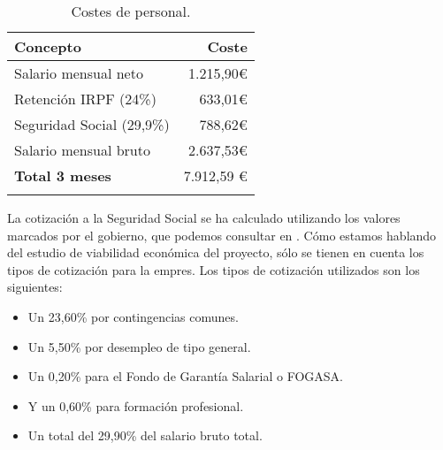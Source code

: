 \begin{longtable}[]{@{}lr@{}}
\toprule
\begin{minipage}[b]{0.38\columnwidth}\raggedright\strut
\textbf{Concepto}\strut
\end{minipage} & \begin{minipage}[b]{0.20\columnwidth}\raggedright\strut
\textbf{Coste}\strut
\end{minipage}\tabularnewline
\midrule
\endhead
\begin{minipage}[t]{0.38\columnwidth}\raggedright\strut
Salario mensual neto\strut
\end{minipage} & \begin{minipage}[t]{0.20\columnwidth}\raggedright\strut
1.215,90\euro{}\strut
\end{minipage}\tabularnewline
\begin{minipage}[t]{0.38\columnwidth}\raggedright\strut
Retención IRPF (24\%)\strut
\end{minipage} & \begin{minipage}[t]{0.20\columnwidth}\raggedright\strut
633,01\euro{}\strut
\end{minipage}\tabularnewline
\begin{minipage}[t]{0.38\columnwidth}\raggedright\strut
Seguridad Social (29,9\%)\strut
\end{minipage} & \begin{minipage}[t]{0.20\columnwidth}\raggedright\strut
788,62\euro{}\strut
\end{minipage}\tabularnewline
\begin{minipage}[t]{0.38\columnwidth}\raggedright\strut
Salario mensual bruto\strut
\end{minipage} & \begin{minipage}[t]{0.20\columnwidth}\raggedright\strut
2.637,53\euro{}\strut
\end{minipage}\tabularnewline
\midrule
\begin{minipage}[t]{0.38\columnwidth}\raggedright\strut
\textbf{Total 3 meses}\strut
\end{minipage} & \begin{minipage}[t]{0.20\columnwidth}\raggedright\strut
7.912,59 \euro{}\strut
\end{minipage}\tabularnewline
\bottomrule
\caption{Costes de personal.}
\end{longtable}

La cotización a la Seguridad Social se ha calculado utilizando los valores marcados por el gobierno, que podemos consultar en \cite{salariogob}. Cómo estamos hablando del estudio de viabilidad económica del proyecto, sólo se tienen en cuenta los tipos de cotización para la empres. Los tipos de cotización utilizados son los siguientes:
\begin{itemize}
\item
	Un 23,60\% por contingencias comunes.
\item
	Un 5,50\% por desempleo de tipo general.
\item
	Un 0,20\% para el Fondo de Garantía Salarial o FOGASA.
\item
	Y un 0,60\% para formación profesional.
\item
	Un total del 29,90\% del salario bruto total.
\end{itemize}

